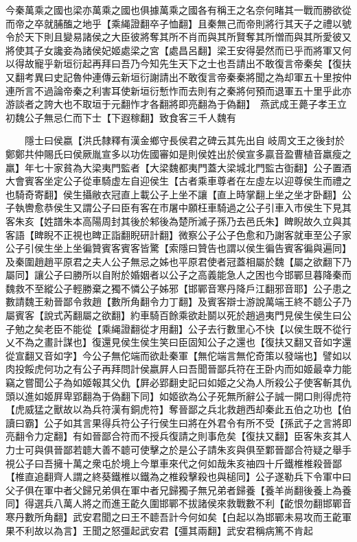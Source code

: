 今秦萬乘之國也梁亦萬乘之國也俱據萬乘之國各有稱王之名奈何睹其一戰而勝欲從而帝之卒就脯醢之地乎【乘䋲證翻卒子恤翻】且秦無己而帝則將行其天子之禮以號令於天下則且變易諸侯之大臣彼將奪其所不肖而與其所賢奪其所憎而與其所愛彼又將使其子女讒妾為諸侯妃姬處梁之宮【處昌呂翻】梁王安得晏然而已乎而將軍又何以得故寵乎新垣衍起再拜曰吾乃今知先生天下之士也吾請出不敢復言帝秦矣【復扶又翻考異曰史記魯仲連傳云新垣衍謝請出不敢復言帝秦秦將聞之為却軍五十里按仲連所言不過論帝秦之利害耳使新垣衍慙怍而去則有之秦將何預而退軍五十里乎此亦游談者之誇大也不取垣于元翻怍才各翻將即亮翻為于偽翻】　燕武成王薨子孝王立初魏公子無忌仁而下士【下遐稼翻】致食客三千人魏有

　　隱士曰侯嬴【洪氏隸釋有漢金鄉守長侯君之碑云其先出自岐周文王之後封於鄭鄭共仲賜氏曰侯厥胤宣多以功佐國審如是則侯姓出於侯宣多贏音盈曹植音羸瘦之羸】年七十家貧為大梁夷門監者【大梁魏都夷門蓋大梁城北門監古衘翻】公子置酒大會賓客坐定公子從車騎虚左自迎侯生【古者乘車尊者在左虛左以迎尊侯生而禮之也騎奇寄翻】侯生攝敝衣冠直上載公子上坐不讓【直上時掌翻上坐之坐才卧翻】公子執轡愈恭侯生又謂公子曰臣有客在市屠中願枉車騎過之公子引車入市侯生下見其客朱亥【姓譜朱本高陽周封其後於邾後為楚所滅子孫乃去邑氏朱】睥睨故久立與其客語【睥睨不正視也睥正詣翻睨研計翻】微察公子公子色愈和乃謝客就車至公子家公子引侯生坐上坐徧贊賓客賓客皆驚【索隱曰贊告也謂以侯生徧告賓客徧與遍同】及秦圍趙趙平原君之夫人公子無忌之姊也平原君使者冠蓋相屬於魏【屬之欲翻下乃屬同】讓公子曰勝所以自附於婚姻者以公子之高義能急人之困也今邯鄲旦暮降秦而魏救不至縱公子輕勝棄之獨不憐公子姊邪【邯鄲音寒丹降戶江翻邪音耶】公子患之數請魏王勑晉鄙令救趙【數所角翻令力丁翻】及賓客辯士游說萬端王終不聼公子乃屬賓客【說式芮翻屬之欲翻】約車騎百餘乘欲赴鬬以死於趙過夷門見侯生侯生曰公子勉之矣老臣不能從【乘䋲證翻從才用翻】公子去行數里心不快【以侯生既不從行乂不為之畫計謀也】復還見侯生侯生笑曰臣固知公子之還也【復扶又翻又音如字還從宣翻又音如字】今公子無佗端而欲赴秦軍【無佗端言無佗奇策以發端也】譬如以肉投餒虎何功之有公子再拜問計侯嬴屛人曰吾聞晉鄙兵符在王卧内而如姬最幸力能竊之嘗聞公子為如姬報其父仇【屛必郢翻史記曰如姬之父為人所殺公子使客斬其仇頭以進如姬屛卑郢翻為于偽翻下同】如姬欲為公子死無所辭公子誠一開口則得虎符【虎威猛之獸故以為兵符漢有銅虎符】奪晉鄙之兵北救趙西却秦此五伯之功也【伯讀曰霸】公子如其言果得兵符公子行侯生曰將在外君令有所不受【孫武子之言將即亮翻令力定翻】有如晉鄙合符而不授兵復請之則事危矣【復扶又翻】臣客朱亥其人力士可與俱晉鄙若聼大善不聼可使擊之於是公子請朱亥與俱至鄴晉鄙合符疑之舉手視公子曰吾擁十萬之衆屯於境上今單車來代之何如哉朱亥䄂四十斤鐵椎椎殺晉鄙【椎直追翻齊人謂之終葵鐵椎以鐵為之椎殺擊殺也與槌同】公子遂勒兵下令軍中曰父子俱在軍中者父歸兄弟俱在軍中者兄歸獨子無兄弟者歸養【養羊尚翻後養上為養同】得選兵八萬人將之而進王齕久圍邯鄲不拔諸侯來救戰數不利【齕恨勿翻邯鄲音寒丹數所角翻】武安君聞之曰王不聼吾計今何如矣【白起以為邯鄲未易攻而王齕軍果不利故以為言】王聞之怒彊起武安君【彊其兩翻】武安君稱病篤不肯起

